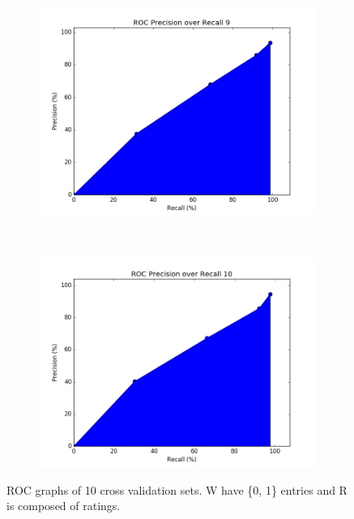 \documentclass[12pt]{article}
\begin{document}
\begin{figure}[h!]
\ContinuedFloat  
        \begin{subfigure}[t]{0.5\textwidth}
        \centering
        \includegraphics[width=1.\textwidth]{graphs/problem3_ROC9}
        \caption{}
    \end{subfigure}%
    ~ 
    \begin{subfigure}[t]{0.5\textwidth}
        \centering
        \includegraphics[width=1.\textwidth]{graphs/problem3_ROC10}
        \caption{}
    \end{subfigure}%
  
    \caption{ROC graphs of 10 cross validation sets. W have \{0, 1\} entries and R is composed of ratings.}
\end{figure}
\end{document}
